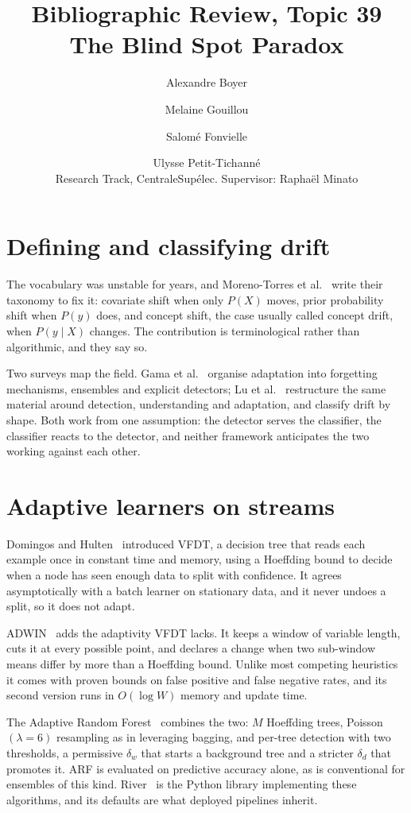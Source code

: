 \documentclass[10pt,a4paper]{article}
\title{\vspace{-1.2cm}Bibliographic Review, Topic 39\\[0.2em]
\large The Blind Spot Paradox}
\author{Alexandre Boyer \and Melaine Gouillou \and Salomé Fonvielle \and Ulysse Petit-Tichanné\\[0.2em]
\normalsize Research Track, CentraleSupélec. Supervisor: Raphaël Minato}
\date{}
\begin{document}
\maketitle
\vspace{-1.4em}

\section{Defining and classifying drift}

The vocabulary was unstable for years, and Moreno-Torres et al.~\cite{moreno2012} write
their taxonomy to fix it: covariate shift when only $P(X)$ moves, prior probability shift
when $P(y)$ does, and concept shift, the case usually called concept drift, when
$P(y\mid X)$ changes. The contribution is terminological rather than algorithmic, and they
say so.

Two surveys map the field. Gama et al.~\cite{gama2014} organise adaptation into forgetting
mechanisms, ensembles and explicit detectors; Lu et al.~\cite{lu2018} restructure the same
material around detection, understanding and adaptation, and classify drift by shape.
Both work from one assumption: the detector serves the classifier, the classifier reacts to
the detector, and neither framework anticipates the two working against each other.

\section{Adaptive learners on streams}

Domingos and Hulten~\cite{domingos2000} introduced VFDT, a decision tree that reads each
example once in constant time and memory, using a Hoeffding bound to decide when a node has
seen enough data to split with confidence. It agrees asymptotically with a batch learner on
stationary data, and it never undoes a split, so it does not adapt.

ADWIN~\cite{bifet2007} adds the adaptivity VFDT lacks. It keeps a window of variable
length, cuts it at every
possible point, and declares a change when two sub-window means differ by more than a
Hoeffding bound. Unlike most competing heuristics it comes with proven bounds on
false positive and false negative rates, and its second version runs in $O(\log W)$ memory
and update time.

The Adaptive Random Forest~\cite{gomes2017} combines the two: $M$ Hoeffding trees,
Poisson$(\lambda{=}6)$ resampling as in leveraging bagging, and per-tree detection with two
thresholds, a permissive $\delta_w$ that starts a background tree and a stricter $\delta_d$
that promotes it. ARF is evaluated on predictive accuracy alone, as is conventional for
ensembles of this kind. River~\cite{montiel2021} is the Python library implementing these
algorithms, and its defaults are what deployed pipelines inherit.
\end{document}
